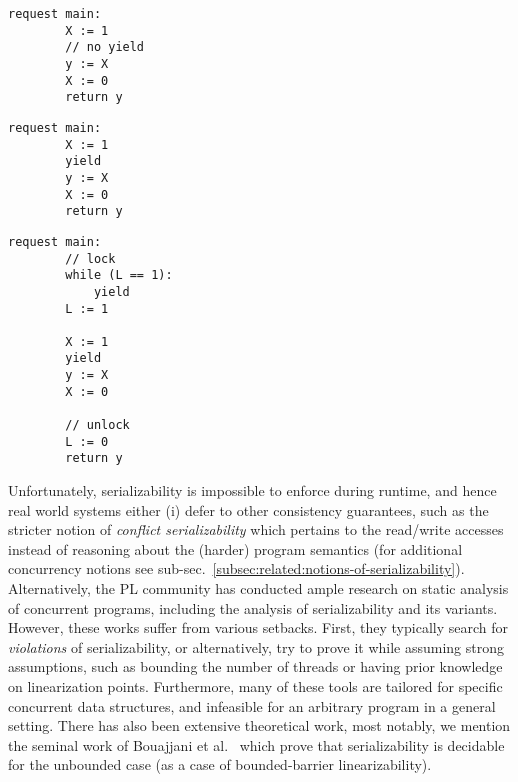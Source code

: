 \noindent
\begin{minipage}[t]{0.45\textwidth}
	\begin{minipage}[t]{\textwidth}
		\begin{lstlisting}[caption={Without yield or lock (serializable)},
			label={lst:MotivatingExample1Ser}]
    request main: 
        X := 1 
        // no yield
        y := X 
        X := 0
        return y 
		\end{lstlisting}
	\end{minipage}
	\vspace{1em}
	\begin{minipage}[t]{\textwidth}
		\begin{lstlisting}[caption={With yield (not serializable)},
			label={lst:MotivatingExample2NonSer}]
    request main: 
        X := 1 
        yield 
        y := X 
        X := 0
        return y 	
		\end{lstlisting}
	\end{minipage}
\end{minipage}%
\hfill
\begin{minipage}[t]{0.45\textwidth}
	\begin{lstlisting}[caption={With yield and lock (serializable)},
		label={lst:MotivatingExample3Ser}]
    request main: 
        // lock
        while (L == 1): 
            yield
        L := 1 

        X := 1
        yield
        y := X 
        X := 0

        // unlock    
        L := 0
        return y 
	\end{lstlisting}
\end{minipage}



Unfortunately, serializability is impossible to enforce during runtime, and hence real world systems either (i) defer to other consistency guarantees, such as the stricter notion of \textit{conflict serializability} which pertains to the read/write accesses instead of reasoning about the (harder) program semantics (for additional concurrency notions see sub-sec.~\ref{subsec:related:notions-of-serializability}). Alternatively, the PL community has conducted ample research on static analysis of concurrent programs, including the analysis of serializability and its variants. However, these works suffer from various setbacks. First, they typically search for \textit{violations} of serializability, or alternatively, try to prove it while assuming strong assumptions, such as bounding the number of threads or having prior knowledge on linearization points.
Furthermore, many of these tools are tailored for specific concurrent data structures, and infeasible for an arbitrary program in a general setting.
%
There has also been extensive theoretical work, most notably, we mention the seminal work of Bouajjani et al.~\cite{BoEmEnHa13} which prove that serializability is decidable for the unbounded case (as a case of bounded-barrier linearizability).


